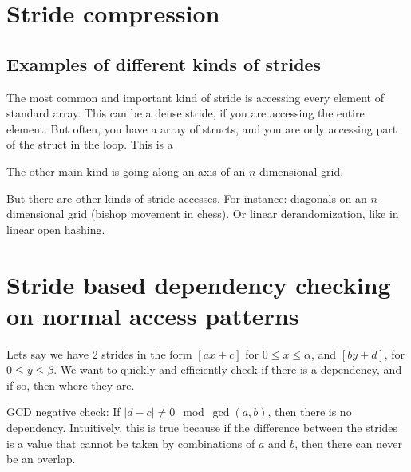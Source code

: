 \documentclass[12pt,twoside]{reedthesis}
\begin{document}





	\section{Stride compression}

		\subsection{Examples of different kinds of strides}
		The most common and important kind of stride is accessing every element of standard array. This can be a dense stride, if you are accessing the entire element. But often, you have a array of structs, and you are only accessing part of the struct in the loop. This is a $ $

		The other main kind is going along an axis of an $n$-dimensional grid.

		But there are other kinds of stride accesses. For instance: diagonals on an $n$-dimensional grid (bishop movement in chess). Or linear derandomization, like in linear open hashing.

	\section{Stride based dependency checking on normal access patterns}

		Lets say we have 2 strides in the form $[ax+c]$ for $0\le x \le \alpha$, and $[by+d]$, for $0 \le y \le \beta$. We want to quickly and efficiently check if there is a dependency, and if so, then where they are.

		GCD negative check: If $|d-c| \ne 0 \mod \gcd(a,b)$, then there is no dependency. Intuitively, this is true because if the difference between the strides is a value that cannot be taken by combinations of $a$ and $b$, then there can never be an overlap.
\end{document}
